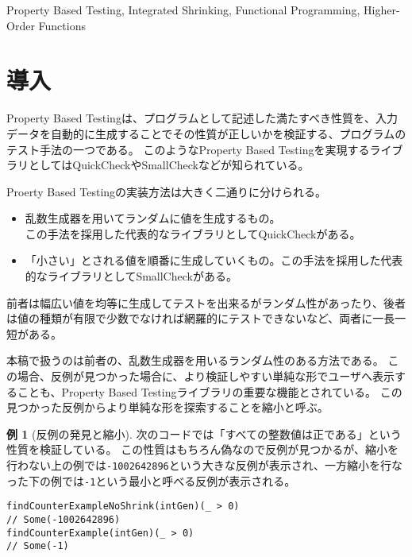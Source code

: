 \documentclass[submit,PRO]{ipsj}
\theoremstyle{definition}
\newtheorem{example}{例}
\begin{document}
\begin{ekeyword}
  Property Based Testing, Integrated Shrinking, Functional Programming, Higher-Order Functions
\end{ekeyword}

\maketitle

\section{導入}

Property Based Testingは、プログラムとして記述した満たすべき性質を、入力データを自動的に生成することでその性質が正しいかを検証する、プログラムのテスト手法の一つである。
このようなProperty Based Testingを実現するライブラリとしてはQuickCheck\cite{claessen_quickcheck_2011}やSmallCheck\cite{runciman_smallcheck_2008}などが知られている。

Proerty Based Testingの実装方法は大きく二通りに分けられる。

\begin{itemize}
  \item 乱数生成器を用いてランダムに値を生成するもの。\\この手法を採用した代表的なライブラリとしてQuickCheckがある。
  \item 「小さい」とされる値を順番に生成していくもの。この手法を採用した代表的なライブラリとしてSmallCheckがある。
\end{itemize}

前者は幅広い値を均等に生成してテストを出来るがランダム性があったり、後者は値の種類が有限で少数でなければ網羅的にテストできないなど、両者に一長一短がある。

本稿で扱うのは前者の、乱数生成器を用いるランダム性のある方法である。
この場合、反例が見つかった場合に、より検証しやすい単純な形でユーザへ表示することも、Property Based Testingライブラリの重要な機能とされている。
この見つかった反例からより単純な形を探索することを縮小と呼ぶ。

\begin{example}[反例の発見と縮小]
次のコードでは「すべての整数値は正である」という性質を検証している。
この性質はもちろん偽なので反例が見つかるが、縮小を行わない上の例では\texttt{-1002642896}という大きな反例が表示され、一方縮小を行なった下の例では\texttt{-1}という最小と呼べる反例が表示される。

\begin{verbatim}
findCounterExampleNoShrink(intGen)(_ > 0)
// Some(-1002642896)
findCounterExample(intGen)(_ > 0)
// Some(-1)
\end{verbatim}
\end{example}
\end{document}
